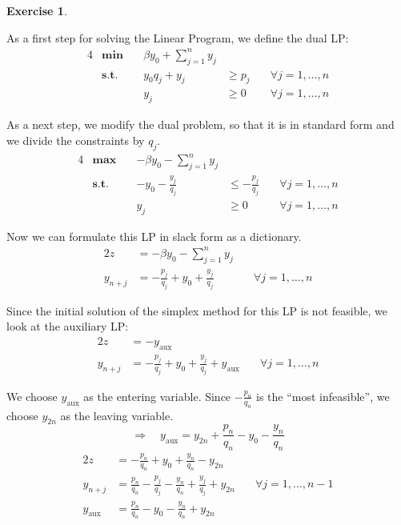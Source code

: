 \documentclass[a4paper,12pt,headsepline]{scrartcl}
\newtheorem{aufgabe}{Exercise}
\begin{document}
\begin{aufgabe}
\end{aufgabe}
As a first step for solving the Linear Program, we define the dual LP:
\begin{alignat*}{4}
  & \textbf{min}\quad  & \beta y_0 +\sum_{j=1}^n y_j \\
  & \textbf{s.t.}\quad & y_0q_j    + y_j             & \ge p_j & \quad\forall j=1,\dots,n \\
  &                    & y_j                         & \ge 0   & \quad\forall j=1,\dots,n
\end{alignat*}

As a next step, we modify the dual problem, so that it is in standard form and we divide the constraints by $q_j$.
\begin{alignat*}{4}
  & \textbf{max}\quad  & -\beta y_0 -\sum_{j=1}^n y_j \\
  & \textbf{s.t.}\quad & -y_0       - \frac{y_j}{q_j} & \le -\frac{p_j}{q_j} & \quad\forall j=1,\dots,n \\
  &                    & y_j                          & \ge 0                & \quad\forall j=1,\dots,n
\end{alignat*}

Now we can formulate this LP in slack form as a dictionary.
\begin{alignat*}{2}
  z       &= -\beta y_0 -\sum_{j=1}^n y_j \\
  y_{n+j} &= -\frac{p_j}{q_j} + y_0 + \frac{y_j}{q_j} & \quad\forall j=1,\dots,n
\end{alignat*}

Since the initial solution of the simplex method for this LP is not feasible, we look at the auxiliary LP:
\begin{alignat*}{2}
  z       &= -y_\text{aux} \\
  y_{n+j} &= -\frac{p_j}{q_j} + y_0 + \frac{y_j}{q_j} + y_\text{aux} & \quad\forall j=1,\dots,n
\end{alignat*}

We choose $y_\text{aux}$ as the entering variable.
Since $-\frac{p_n}{q_n}$ is the ``most infeasible'', we choose $y_{2n}$ as the leaving variable.
\[ \Rightarrow\quad y_\text{aux} = y_{2n}+\frac{p_n}{q_n}-y_0-\frac{y_n}{q_n} \]
\begin{alignat*}{2}
  z            &= -\frac{p_n}{q_n}+y_0+\frac{y_n}{q_n}-y_{2n} \\
  y_{n+j}      &= \frac{p_n}{q_n}-\frac{p_j}{q_j}-\frac{y_n}{q_n}+\frac{y_j}{q_j}+y_{2n} & \quad\forall j=1,\dots,n-1 \\
  y_\text{aux} &= \frac{p_n}{q_n}-y_0-\frac{y_n}{q_n}+y_{2n}
\end{alignat*}
\end{document}
